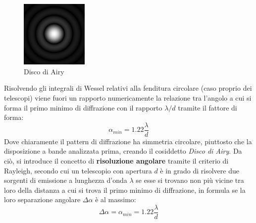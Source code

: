 \documentclass[a4paper,twoside,openany,notitlepage]{book}
\theoremstyle{definition}
\theoremstyle{plain}
\begin{document}
\begin{figure}
	\vspace{-10pt}
	\centering
	\includegraphics[width=0.29\textwidth]{Immagini/Capitolo2/Disco_Airy.PNG}
	\caption*{Disco di Airy}
	\vspace{-10pt}
\end{figure}

Risolvendo gli integrali di Wessel relativi alla fenditura circolare (caso proprio dei telescopi) viene fuori un rapporto numericamente la relazione tra l'angolo a cui si forma il primo minimo di diffrazione con il rapporto $\lambda/d$ tramite il fattore di forma:
\begin{equation*}
	\alpha_{min}=1.22\frac{\lambda}{d}
\end{equation*}
Dove chiaramente il pattern di diffrazione ha simmetria circolare, piuttosto che la disposizione a bande analizzata prima, creando il cosiddetto \textit{Disco di Airy}. Da ciò, si introduce il concetto di \textbf{risoluzione angolare} tramite il criterio di Rayleigh, secondo cui un telescopio con apertura $d$ è in grado di risolvere due sorgenti di emissione a lunghezza d'onda $\lambda$ se esse si trovano non più vicine tra loro della distanza a cui si trova il primo minimo di diffrazione, in formula se la loro separazione angolare $\Delta\alpha$ è al massimo:
\begin{equation*}
	\Delta\alpha = \alpha_{min} = 1.22\frac{\lambda}{d}
\end{equation*}
\end{document}
